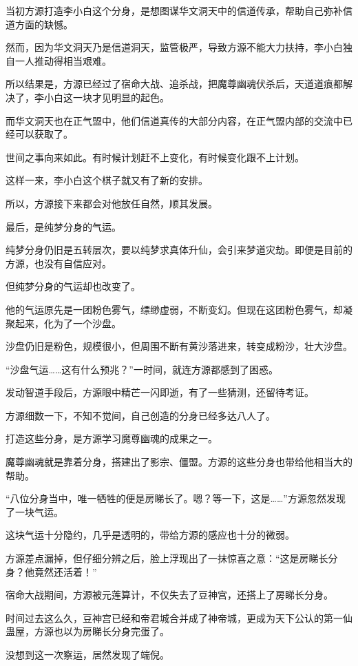 \begin{this_body}
当初方源打造李小白这个分身，是想图谋华文洞天中的信道传承，帮助自己弥补信道方面的缺憾。

然而，因为华文洞天乃是信道洞天，监管极严，导致方源不能大力扶持，李小白独自一人推动得相当艰难。

所以结果是，方源已经过了宿命大战、追杀战，把魔尊幽魂伏杀后，天道道痕都解决了，李小白这一块才见明显的起色。

而华文洞天也在正气盟中，他们信道真传的大部分内容，在正气盟内部的交流中已经可以获取了。

世间之事向来如此。有时候计划赶不上变化，有时候变化跟不上计划。

这样一来，李小白这个棋子就又有了新的安排。

所以，方源接下来都会对他放任自然，顺其发展。

最后，是纯梦分身的气运。

纯梦分身仍旧是五转层次，要以纯梦求真体升仙，会引来梦道灾劫。即便是目前的方源，也没有自信应对。

但纯梦分身的气运却也改变了。

他的气运原先是一团粉色雾气，缥缈虚弱，不断变幻。但现在这团粉色雾气，却凝聚起来，化为了一个沙盘。

沙盘仍旧是粉色，规模很小，但周围不断有黄沙落进来，转变成粉沙，壮大沙盘。

“沙盘气运……这有什么预兆？”一时间，就连方源都感到了困惑。

发动智道手段后，方源眼中精芒一闪即逝，有了一些猜测，还留待考证。

方源细数一下，不知不觉间，自己创造的分身已经多达八人了。

打造这些分身，是方源学习魔尊幽魂的成果之一。

魔尊幽魂就是靠着分身，搭建出了影宗、僵盟。方源的这些分身也带给他相当大的帮助。

“八位分身当中，唯一牺牲的便是房睇长了。嗯？等一下，这是……”方源忽然发现了一块气运。

这块气运十分隐约，几乎是透明的，带给方源的感应也十分的微弱。

方源差点漏掉，但仔细分辨之后，脸上浮现出了一抹惊喜之意：“这是房睇长分身？他竟然还活着！”

宿命大战期间，方源被元莲算计，不仅失去了豆神宫，还搭上了房睇长分身。

时间过去这么久，豆神宫已经和帝君城合并成了神帝城，更成为天下公认的第一仙蛊屋，方源也以为房睇长分身完蛋了。

没想到这一次察运，居然发现了端倪。


\end{this_body}
